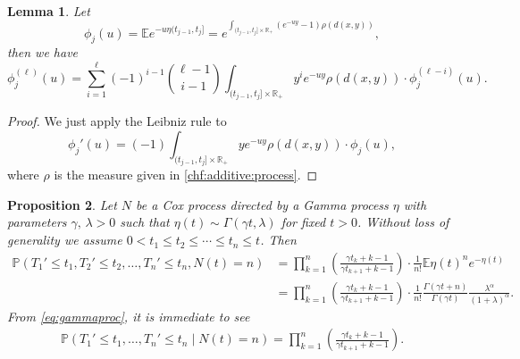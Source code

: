\documentclass[11pt,leqno%
]{amsart}
\newtheorem{lemma}{Lemma}[section]
\newtheorem{proposition}[lemma]{Proposition}
\newcommand{\R}{\mathbb{R}}
\newcommand{\E }{{\mathbb E}}
\renewcommand{\P }{{\mathbb P}}
\newcommand{\1}{{\mathbf 1}}
\begin{document}
\begin{lemma}
 Let 
\[
 \phi_j(u)=\E e^{-u \eta(t_{j-1},t_j]}=e^{\int_{(t_{j-1},t_j]\times
 \R_+}(e^{-uy}-1)\rho (d (x,y))},
\]
then we have 
\[
 \phi_j^{(\ell)}(u) = \sum_{i=1}^\ell (-1)^{i-1} \binom{\ell-1}{i-1} \int_{(t_{j-1},t_j]\times \R_+} y^i e^{-uy}
 \rho (d (x,y))\cdot \phi_j^{(\ell-i)}(u).
\]
\end{lemma}

\begin{proof}
 We just apply the Leibniz rule to 
 \[
  \phi_j'(u)=(-1) \int_{(t_{j-1},t_j]\times \R_+} y e^{-uy} \rho (d
 (x,y))\cdot \phi_j(u), 
 \]
where $\rho$ is the measure given in \eqref{chf:additive:process}. %
\end{proof}

\begin{proposition}
 Let $N$ be a Cox process directed by a Gamma process $\eta$ with parameters
 $\gamma,\,\lambda>0$ such that $\eta(t)\sim \Gamma (\gamma
 t,\lambda)$ for fixed $t>0$. Without loss of generality we assume
 $0<t_1\le t_2 \le \cdots \le t_n \le t$. Then 
\begin{align}
 \P(T_1'\le t_1,T_2' \le t_2,\ldots,T_n' \le t_n, N(t)=n) &=
 \prod_{k=1}^n \left(
\frac{\gamma t_k + k-1}{\gamma t_{k+1}+k-1}\right) \cdot \frac{1}{n!} \E
 \eta(t)^n e^{-\eta(t)} \nonumber \\
 &= \prod_{k=1}^n \left(
\frac{\gamma t_k + k-1}{\gamma t_{k+1}+k-1}\right) \cdot \frac{1}{n!}
 \frac{\Gamma(\gamma t+n)}{\Gamma (\gamma t)}
 \frac{\lambda^\alpha}{(1+\lambda)^\alpha}. \label{eq:gammaproc}
\end{align}
 From \eqref{eq:gammaproc}, it is immediate to see 
\begin{align*}
 \P(T_1'\le t_1,\ldots,T_n' \le t_n \mid N(t)=n) = \prod_{k=1}^n \left(
\frac{\gamma t_k + k-1}{\gamma t_{k+1}+k-1}
\right).
\end{align*} 
\end{proposition}
\end{document}
